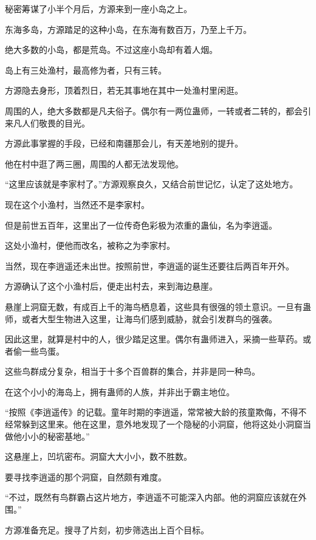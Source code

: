 
\begin{this_body}

秘密筹谋了小半个月后，方源来到一座小岛之上。

东海多岛，方源踏足的这种小岛，在东海有数百万，乃至上千万。

绝大多数的小岛，都是荒岛。不过这座小岛却有着人烟。

岛上有三处渔村，最高修为者，只有三转。

方源隐去身形，顶着烈日，若无其事地在其中一处渔村里闲逛。

周围的人，绝大多数都是凡夫俗子。偶尔有一两位蛊师，一转或者二转的，都会引来凡人们敬畏的目光。

方源此事掌握的手段，已经和南疆那会儿，有天差地别的提升。

他在村中逛了两三圈，周围的人都无法发现他。

“这里应该就是李家村了。”方源观察良久，又结合前世记忆，认定了这处地方。

现在这个小渔村，当然还不是李家村。

但是前世五百年，这里出了一位传奇色彩极为浓重的蛊仙，名为李逍遥。

这处小渔村，便他而改名，被称之为李家村。

当然，现在李逍遥还未出世。按照前世，李逍遥的诞生还要往后两百年开外。

方源确认了这个小渔村后，便走出村去，来到海边悬崖。

悬崖上洞窟无数，有成百上千的海鸟栖息着，这些具有很强的领土意识。一旦有蛊师，或者大型生物进入这里，让海鸟们感到威胁，就会引发群鸟的强袭。

因此这里，就算是村中的人，很少踏足这里。偶尔有蛊师进入，采摘一些草药。或者偷一些鸟蛋。

这些鸟群成分复杂，相当于十多个百兽群的集合，并非是同一种鸟。

在这个小小的海岛上，拥有蛊师的人族，并非出于霸主地位。

“按照《李逍遥传》的记载。童年时期的李逍遥，常常被大龄的孩童欺侮，不得不经常躲到这里来。他在这里，意外地发现了一个隐秘的小洞窟，他将这处小洞窟当做他小小的秘密基地。”

这悬崖上，凹坑密布。洞窟大大小小，数不胜数。

要寻找李逍遥的那个洞窟，自然颇有难度。

“不过，既然有鸟群霸占这片地方，李逍遥不可能深入内部。他的洞窟应该就在外围。”

方源准备充足。搜寻了片刻，初步筛选出上百个目标。


\end{this_body}
